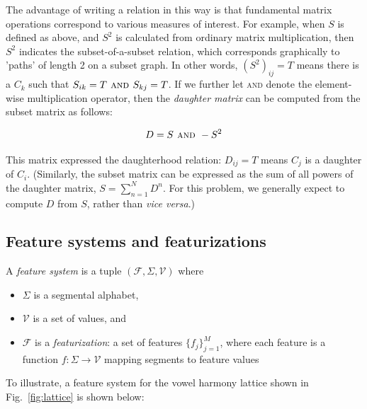 \documentclass[11pt, oneside]{article}   	%
\begin{document}
\noindent The advantage of writing a relation in this way is that fundamental matrix operations correspond to various measures of interest. For example, when $S$ is defined as above, and $S^2$ is calculated from ordinary matrix multiplication, then $S^2$ indicates the subset-of-a-subset relation, which corresponds graphically to 'paths' of length 2 on a subset graph. In other words, $(S^2)_{ij} = T$ means there is a $C_k$ such that $S_{ik} = T \textsc{ and } S_{kj} = T$. If we further let \textsc{and} denote the element-wise multiplication operator, then the \textit{daughter matrix} can be computed from the subset matrix as follows: 

$$D = S \textsc{ and } -S^2$$

\noindent This matrix expressed the daughterhood relation: $D_{ij} = T$ means $C_j$ is a daughter of $C_i$. (Similarly, the subset matrix can be expressed as the sum of all powers of the daughter matrix, $S = \sum_{n=1}^N D^n$. For this problem, we generally expect to compute $D$ from $S$, rather than \textit{vice versa}.)

\subsection{Feature systems and featurizations}

\vspace{\baselineskip} A \textit{feature system} is a tuple $(\mathcal F, \Sigma, \mathcal V)$ where \begin{itemize}
    \item $\Sigma$ is a segmental alphabet, 
    \item $\mathcal V$ is a set of values, and 
    \item $\mathcal F$ is a \textit{featurization}: a set of features $\{f_j\}_{j=1}^M$, where each feature is a function $f: \Sigma \rightarrow \mathcal V$ mapping segments to feature values
    \end{itemize}

\noindent To illustrate, a feature system for the vowel harmony lattice shown in Fig.~\ref{fig:lattice} is shown below:
\end{document}
